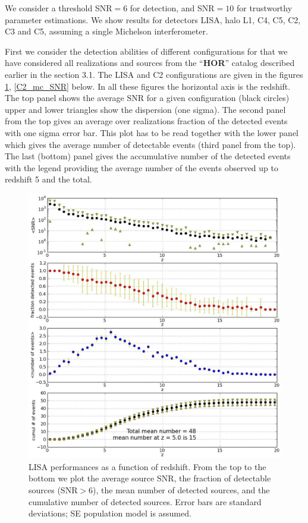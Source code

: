 \documentclass{iopart}
\begin{document}
We consider a threshold SNR$=6$ for detection, and SNR$=10$ for trustworthy parameter estimations. We show results for detectors LISA, halo L1, C4, C5, C2, C3 and C5,  assuming a single Michelson interferometer. 

First we consider the detection abilities of different configurations for that we have considered all realizations and sources from 
the ``{\bf HOR}'' catalog  described earlier in the section 3.1. The LISA and C2 configurations are given in the figures \ref{LISA_mc_SNR},
 \ref{C2_mc_SNR} below.  In all these figures the horizontal axis is the redshift. The top panel shows the average SNR for a given 
 configuration (black circles) upper and lower triangles show the dispersion (one sigma). The second panel from the top gives an 
 average over realizations fraction of the  detected events with one sigma error bar. This plot has to be read together with the lower panel
 which gives the average number of detectable events (third panel from the top). The last (bottom) panel gives the accumulative number of the 
 detected events with the legend providing the average number of the events observed up to redshift 5 and the total.



\begin{figure}[H]
\center
   \includegraphics[width=1\textwidth]{FigSMBHPhenomAEI/LISA_mc_SNRs.eps}
\caption{LISA performances as a function of redshift. From the top to the bottom we plot the average source SNR, the fraction of detectable sources (SNR$>6$), the mean number of detected sources, and the cumulative number of detected sources. Error bars are standard deviations; SE population model is assumed.
\label{LISA_mc_SNR} } 
\end{figure}
\end{document}

